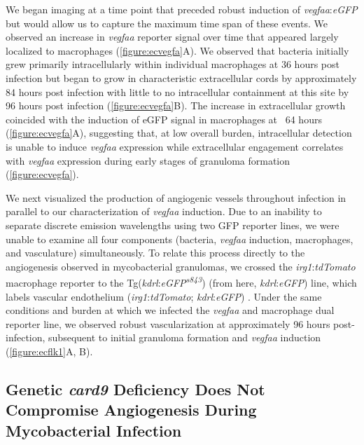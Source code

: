 We began imaging at a time point that preceded robust induction of \textit{vegfaa}:\textit{eGFP} but would allow us to capture the maximum time span of these events. We observed an increase in \textit{vegfaa} reporter signal over time that appeared largely localized to macrophages (\autoref{figure:ecvegfa}A). We observed that bacteria initially grew primarily intracellularly within individual macrophages at 36 hours post infection but began to grow in characteristic extracellular cords by approximately 84 hours post infection with little to no intracellular containment at this site by 96 hours post infection (\autoref{figure:ecvegfa}B). The increase in extracellular growth coincided with the induction of eGFP signal in macrophages at ~64 hours (\autoref{figure:ecvegfa}A), suggesting that, at low overall burden, intracellular detection is unable to induce \textit{vegfaa} expression while extracellular engagement correlates with \textit{vegfaa} expression during early stages of granuloma formation (\autoref{figure:ecvegfa}). 

We next visualized the production of angiogenic vessels throughout infection in parallel to our characterization of \textit{vegfaa} induction. Due to an inability to separate discrete emission wavelengths using two GFP reporter lines, we were unable to examine all four components (bacteria, \textit{vegfaa} induction, macrophages, and vasculature) simultaneously. To relate this process directly to the angiogenesis observed in mycobacterial granulomas, we crossed the \textit{irg1}:\textit{tdTomato} macrophage reporter to the Tg(\textit{kdrl}:\textit{eGFP\textsuperscript{s843}}) (from here, \textit{kdrl}:\textit{eGFP}) line, which labels vascular endothelium (\textit{irg1}:\textit{tdTomato}; \textit{kdrl}:\textit{eGFP}) \citep{Jin2005}. Under the same conditions and burden at which we infected the \textit{vegfaa} and macrophage dual reporter line, we observed robust vascularization at approximately 96 hours post-infection, subsequent to initial granuloma formation and \textit{vegfaa} induction (\autoref{figure:ecflk1}A, B). 

\subsection{Genetic \textit{card9} Deficiency Does Not Compromise Angiogenesis During Mycobacterial Infection}


